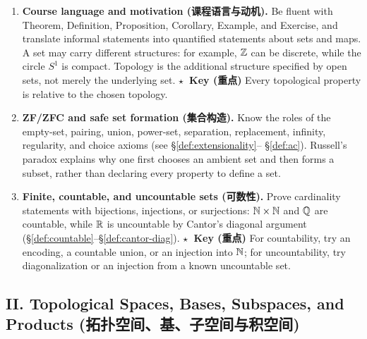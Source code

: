 \documentclass{article}
\newcommand{\reviewkey}{\textcolor{red!65!black}{\textbf{\ensuremath{\star}\ Key (重点)}}}
\begin{document}
\begin{enumerate}
  \item \textbf{Course language and motivation (课程语言与动机).} Be fluent with
  Theorem, Definition, Proposition, Corollary, Example, and Exercise, and
  translate informal statements into quantified statements about sets and maps.
  A set may carry different structures: for example, $\mathbb{Z}$ can be discrete,
  while the circle $S^1$ is compact. Topology is the additional structure
  specified by open sets, not merely the underlying set. \reviewkey{} Every
  topological property is relative to the chosen topology.

  \item \textbf{ZF/ZFC and safe set formation (集合构造).} Know the roles of
  the empty-set, pairing, union, power-set, separation, replacement, infinity,
  regularity, and choice axioms (see \S\ref{def:extensionality}--
  \S\ref{def:ac}). Russell's paradox explains why one first chooses an ambient
  set and then forms a subset, rather than declaring every property to define a set.

  \item \textbf{Finite, countable, and uncountable sets (可数性).} Prove
  cardinality statements with bijections, injections, or surjections:
  $\mathbb{N}\times\mathbb{N}$ and $\mathbb{Q}$ are countable, while $\mathbb{R}$ is uncountable by Cantor's
  diagonal argument (\S\ref{def:countable}--\S\ref{def:cantor-diag}).
  \reviewkey{} For countability, try an encoding, a countable union, or an
  injection into $\mathbb{N}$; for uncountability, try diagonalization or an injection
  from a known uncountable set.
\end{enumerate}

\subsection*{II. Topological Spaces, Bases, Subspaces, and Products
(拓扑空间、基、子空间与积空间)}
\end{document}
